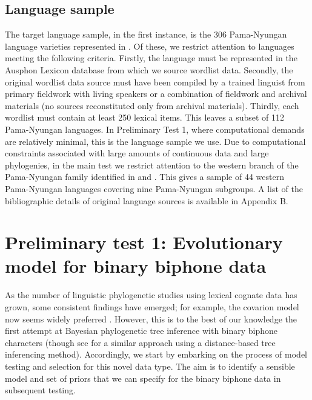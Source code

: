 \hypertarget{language-sample}{%
\subsection{Language sample}\label{language-sample}}

The target language sample, in the first instance, is the 306 Pama-Nyungan language varieties represented in \textcite{bouckaert_origin_2018}. Of these, we restrict attention to languages meeting the following criteria. Firstly, the language must be represented in the Ausphon Lexicon database \autocite{round_ausphon-lexicon_2017} from which we source wordlist data. Secondly, the original wordlist data source must have been compiled by a trained linguist from primary fieldwork with living speakers or a combination of fieldwork and archival materials (no sources reconstituted only from archival materials). Thirdly, each wordlist must contain at least 250 lexical items. This leaves a subset of 112 Pama-Nyungan languages. In Preliminary Test 1, where computational demands are relatively minimal, this is the language sample we use. Due to computational constraints associated with large amounts of continuous data and large phylogenies, in the main test we restrict attention to the western branch of the Pama-Nyungan family identified in \textcite{bowern_computational_2012} and \textcite{bouckaert_origin_2018}. This gives a sample of 44 western Pama-Nyungan languages covering nine Pama-Nyungan subgroups. A list of the bibliographic details of original language sources is available in Appendix B.

\hypertarget{prelim-1}{%
\section{Preliminary test 1: Evolutionary model for binary biphone data}\label{prelim-1}}

As the number of linguistic phylogenetic studies using lexical cognate data has grown, some consistent findings have emerged; for example, the covarion model now seems widely preferred \autocites[e.g.][]{bouckaert_origin_2018}{kolipakam_bayesian_2018}{savelyev_bayesian_2020}. However, this is to the best of our knowledge the first attempt at Bayesian phylogenetic tree inference with binary biphone characters (though see \textcite{jager_inferring_2016} for a similar approach using a distance-based tree inferencing method). Accordingly, we start by embarking on the process of model testing and selection for this novel data type. The aim is to identify a sensible model and set of priors that we can specify for the binary biphone data in subsequent testing.

